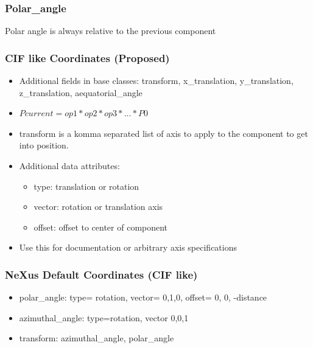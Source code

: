\documentclass{beamer}
\begin{document}
\begin{frame} \frametitle{Polar\_angle }
Polar angle is always relative to the previous component 
\begin{figure}[!ht]
\end{figure}
\end{frame}


\begin{frame} \frametitle{CIF like Coordinates (Proposed)}
\begin{itemize}
\item Additional fields in base classes: transform, x\_translation, y\_translation, z\_translation, 
  aequatorial\_angle
\item $Pcurrent = op1*op2*op3*...*P0$
\item transform is a komma separated list of axis to apply to the component to get into position. 
\item Additional data attributes: 
\begin{itemize}
\item type: translation or rotation
\item vector: rotation or translation axis
\item offset: offset to center of component
\end{itemize}
\item Use this for documentation or arbitrary axis specifications
\end{itemize}
\end{frame}

\begin{frame} \frametitle{NeXus Default Coordinates (CIF like)}
\begin{itemize}
\item polar\_angle: type= rotation, vector= 0,1,0, offset= 0, 0, -distance
\item azimuthal\_angle: type=rotation, vector 0,0,1
\item transform: azimuthal\_angle, polar\_angle
\end{itemize}
\end{frame}
\end{document}

